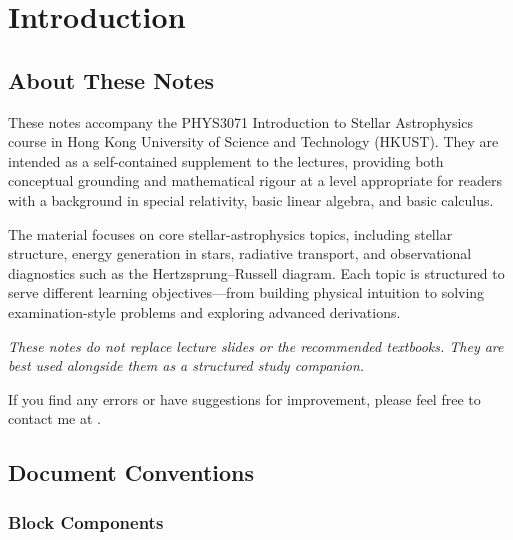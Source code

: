 
\chapter*{Introduction}


\section*{About These Notes}

These notes accompany the PHYS3071 Introduction to Stellar Astrophysics course in Hong Kong University of Science and Technology (HKUST).
They are intended as a self-contained supplement to the lectures,
providing both conceptual grounding and mathematical rigour at a level
appropriate for readers with a background in special relativity, basic linear algebra, and basic calculus.

\medskip\noindent
The material focuses on core stellar-astrophysics topics, including stellar structure,
energy generation in stars, radiative transport, and observational diagnostics such as
the Hertzsprung--Russell diagram.
Each topic is structured to serve different learning objectives---from building
physical intuition to solving examination-style problems and exploring
advanced derivations.

\medskip\noindent
\textit{These notes do not replace lecture slides or the recommended textbooks.
They are best used alongside them as a structured study companion.}

\medskip\noindent
If you find any errors or have suggestions for improvement, please feel free to contact me at \texttt{\NoteAuthorEmail}.

\section*{Document Conventions}

\subsection*{Block Components}

